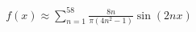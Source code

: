 \documentclass[preview]{standalone}
\begin{document}
\begin{align*}
f(x) \approx \sum_{n=1}^{58} \frac{8n}{\pi(4n^2-1)} \sin(2nx)
\end{align*}
\end{document}
